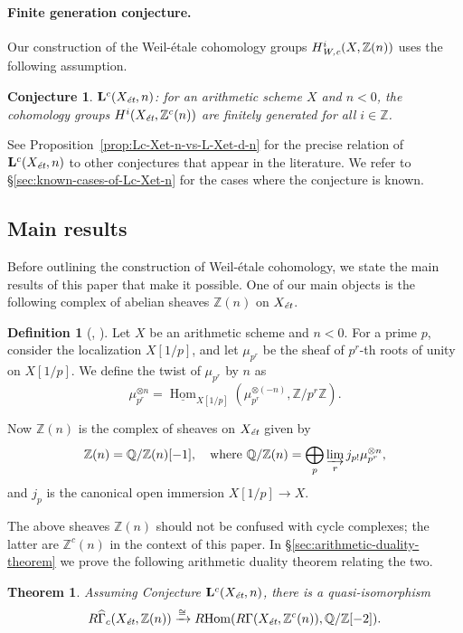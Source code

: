 \documentclass[leqno,12pt]{article}
\theoremstyle{plain}
\newtheorem{conjecture}[theorem]{\indent\sc Conjecture}
\newtheorem{maintheorem}{Theorem}
\theoremstyle{definition}
\newtheorem{definition}[theorem]{\indent\sc Definition}
\DeclareMathOperator{\Hom}{Hom}
\newcommand{\QQ}{\mathbb{Q}}
\newcommand{\ZZ}{\mathbb{Z}}
\newcommand{\Wc}{\text{\it W,c}}
\newcommand{\et}{\text{\it \'{e}t}}
\newcommand{\iHom}{\underline{\Hom}}
\newcommand{\RHom}{R\!\Hom}
\begin{document}
\paragraph{Finite generation conjecture.}
Our construction of the Weil-\'{e}tale cohomology groups $H^i_\Wc (X,\ZZ(n))$
uses the following assumption.

\begin{conjecture}
  $\mathbf{L}^c (X_\et,n)$: for an arithmetic scheme $X$ and $n < 0$,
  the cohomology groups $H^i (X_\et, \ZZ^c (n))$ are finitely generated for all
  $i \in \ZZ$.
\end{conjecture}

See Proposition~\ref{prop:Lc-Xet-n-vs-L-Xet-d-n} for the precise relation of
$\mathbf{L}^c (X_\et,n)$ to other conjectures that appear in the literature.
We refer to \S\ref{sec:known-cases-of-Lc-Xet-n} for the cases where the
conjecture is known.

\subsection*{Main results}

Before outlining the construction of Weil-\'{e}tale cohomology, we state the
main results of this paper that make it possible. One of our main objects is the
following complex of abelian sheaves $\ZZ (n)$ on $X_\et$.

\begin{definition}[{\cite[\S 3.1]{Flach-Morin-2018}}, {\cite[\S 7]{Geisser-2004}}]
  \label{dfn:sheaf-Z(n)}
  Let $X$ be an arithmetic scheme and $n < 0$. For a prime $p$, consider
  the localization $X [1/p]$, and let $\mu_{p^r}$ be the sheaf of $p^r$-th
  roots of unity on $X [1/p]$. We define the twist of $\mu_{p^r}$ by $n$
  as
  $$\mu_{p^r}^{\otimes n} = \iHom_{X[1/p]} (\mu_{p^r}^{\otimes (-n)}, \ZZ/p^r\ZZ).$$

  Now $\ZZ (n)$ is the complex of sheaves on $X_\et$ given by
  \[ \ZZ (n) = \QQ/\ZZ (n) [-1],
  \quad \text{where }
  \QQ/\ZZ (n) = \bigoplus_p \varinjlim_r j_{p!} \mu_{p^r}^{\otimes n}, \]
  and $j_p$ is the canonical open immersion $X[1/p] \to X$.
\end{definition}

The above sheaves $\ZZ (n)$ should not be confused with cycle complexes;
the latter are $\ZZ^c (n)$ in the context of this paper.
In \S\ref{sec:arithmetic-duality-theorem} we prove the following arithmetic
duality theorem relating the two.

\begin{maintheorem}
  \label{theorem-I}
  Assuming Conjecture $\mathbf{L}^c (X_\et,n)$, there is a quasi-isomorphism
  \[ R\widehat{\Gamma}_c (X_\et, \ZZ (n)) \xrightarrow{\cong}
    \RHom (R\Gamma (X_\et, \ZZ^c (n)), \QQ/\ZZ [-2]). \]
\end{maintheorem}
\end{document}
